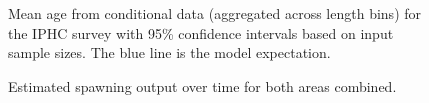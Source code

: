 \documentclass[
]{scrartcl}
\begin{document}
\begin{figure}


\caption{\label{fig-mean-age-12}Mean age from conditional data
(aggregated across length bins) for the IPHC survey with 95\% confidence
intervals based on input sample sizes. The blue line is the model
expectation.}

\end{figure}%

\begin{figure}


\caption{\label{fig-spout_combined}Estimated spawning output over time
for both areas combined.}

\end{figure}%
\end{document}
